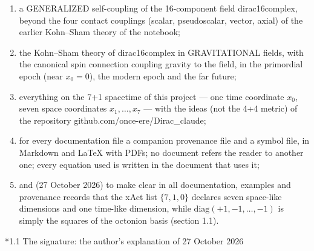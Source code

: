 \documentclass[10pt,a4paper]{article}
\makeatletter
\renewcommand\subsection{\@startsection{subsection}{2}{\z@}{-3.25ex\@plus -1ex \@minus -.2ex}{1.5ex \@plus .2ex}{\normalfont\large\bfseries\raggedright}}
\makeatother
\begin{document}
\begin{enumerate}
\item a GENERALIZED self-coupling of the 16-component field dirac16complex, beyond the four contact couplings (scalar, pseudoscalar, vector, axial) of the earlier Kohn–Sham theory of the notebook;
\item the Kohn–Sham theory of dirac16complex in GRAVITATIONAL fields, with the canonical spin connection coupling gravity to the field, in the primordial epoch (near $x_0=0$), the modern epoch and the far future;
\item everything on the 7+1 spacetime of this project — one time coordinate $x_0$, seven space coordinates $x_1,\dots,x_7$ — with the ideas (not the 4+4 metric) of the repository github.com/once-ere/Dirac\_claude;
\item for every documentation file a companion provenance file and a symbol file, in Markdown and LaTeX with PDFs; no document refers the reader to another one; every equation used is written in the document that uses it;
\item and (27 October 2026) to make clear in all documentation, examples and provenance records that the xAct list $\{7,1,0\}$ declares seven space-like dimensions and one time-like dimension, while $\mathrm{diag}(+1,-1,\dots,-1)$ is simply the squares of the octonion basis (section 1.1).
\end{enumerate}
\subsection*{1.1 The signature: the author’s explanation of 27 October 2026}
\end{document}
